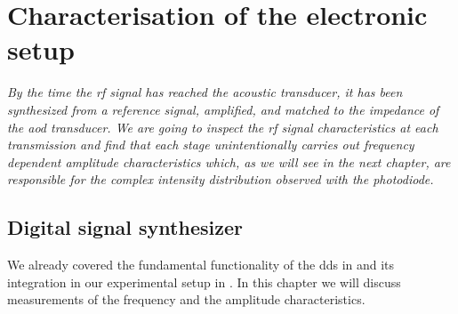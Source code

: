 \chapter{Characterisation of the electronic setup}\label{ch:electronic_setup}

\textit{By the time the \gls{rf} signal has reached the acoustic transducer,
it has been synthesized from a reference signal, amplified, and matched to
the impedance of the \gls{aod} transducer. We are going to inspect the
\gls{rf} signal characteristics at each transmission and find that each stage
unintentionally carries out frequency dependent amplitude characteristics
which, as we will see in the next chapter, are responsible for the complex
intensity distribution observed with the photodiode.}

\section{Digital signal synthesizer}

We already covered the fundamental functionality of the \gls{dds} in
 and its integration in our experimental
setup in . In this chapter we will discuss
measurements of the frequency and the amplitude characteristics.

